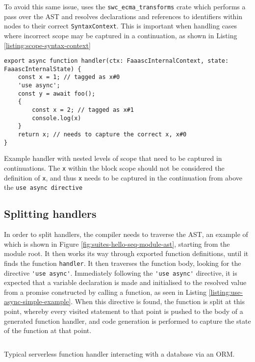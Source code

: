 To avoid this same issue, \faaasc{} uses the \verb|swc_ecma_transforms| crate which performs a pass over the AST and resolves declarations and references to identifiers within nodes to their correct \verb|SyntaxContext|. This is important when handling cases where incorrect scope may be captured in a continuation, as shown in Listing \ref{listing:scope-syntax-context}

\begin{listing}[H]
\begin{verbatim}
export async function handler(ctx: FaaascInternalContext, state: FaaascInternalState) {
    const x = 1; // tagged as x#0
    'use async';
    const y = await foo();
    {
        const x = 2; // tagged as x#1
        console.log(x)
    }
    return x; // needs to capture the correct x, x#0
}
\end{verbatim}
\caption{Example \faaas{} handler with nested levels of scope that need to be captured in continuations. The \texttt{x} within the block scope should not be considered the definition of \texttt{x}, and thus \texttt{x} needs to be captured in the continuation from above the \texttt{use async directive}}
\label{listing:scope-syntax-context}
\end{listing}

\subsection{Splitting \faas{} handlers}
\label{sec:faaasc-codegen-ast}
In order to split handlers, the \faaasc{} compiler needs to traverse the AST, an example of which is shown in Figure \ref{fig:suites-hello-seq-module-ast}, starting from the module root. It then works its way through exported function definitions, until it finds the function \verb|handler|. It then traverses the function body, looking for the directive \verb|'use async'|. Immediately following the \verb|'use async'| directive, it is expected that a variable declaration is made and initialised to the resolved value from a promise constructed by calling a function, as seen in Listing \ref{listing:use-async-simple-example}. When this directive is found, the function is split at this point, whereby every visited statement to that point is pushed to the body of a generated function handler, and code generation is performed to capture the state of the function at that point.

\begin{listing}
  \inputminted{javascript}{node_modules/@faaas-bench/hello-seq/src/onHttpGetHello.trigger.ts}
  \caption{Typical serverless function handler interacting with a database via an ORM.}
\end{listing}

